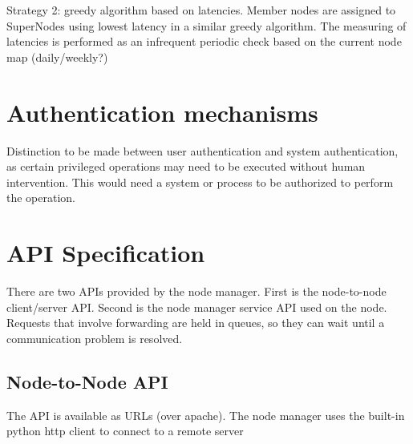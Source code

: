 \documentclass[oneside,12pt]{memoir}
\begin{document}
Strategy 2:  greedy algorithm based on latencies.  Member nodes are assigned to SuperNodes using lowest latency in a similar greedy algorithm.  The measuring of latencies is performed as an infrequent periodic check based on the current node map (daily/weekly?)




\section{Authentication mechanisms}
Distinction to be made between user authentication and system authentication, as certain privileged operations may need to be executed without human intervention. This would need a system or process to be authorized to perform the operation. 




\section{API Specification}

There are two APIs provided by the node manager.  First is the node-to-node client/server API.  Second is the node manager service API used on the node.  Requests that involve forwarding are held in queues, so they can wait until a communication problem is resolved. 

\subsection{Node-to-Node API}

The API is available as URLs (over apache). The node manager uses the built-in python http client to connect to a remote server
\end{document}
